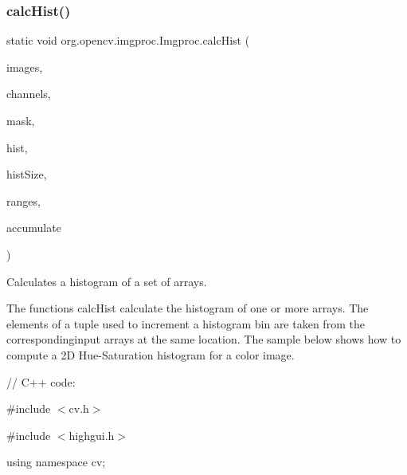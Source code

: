 \subsubsection{\texorpdfstring{calc\+Hist()}{calcHist()}\hspace{0.1cm}{\footnotesize\ttfamily [1/2]}}
{\footnotesize\ttfamily static void org.\+opencv.\+imgproc.\+Imgproc.\+calc\+Hist (\begin{DoxyParamCaption}\item[{List$<$ \mbox{\hyperlink{classorg_1_1opencv_1_1core_1_1_mat}{Mat}} $>$}]{images,  }\item[{\mbox{\hyperlink{classorg_1_1opencv_1_1core_1_1_mat_of_int}{Mat\+Of\+Int}}}]{channels,  }\item[{\mbox{\hyperlink{classorg_1_1opencv_1_1core_1_1_mat}{Mat}}}]{mask,  }\item[{\mbox{\hyperlink{classorg_1_1opencv_1_1core_1_1_mat}{Mat}}}]{hist,  }\item[{\mbox{\hyperlink{classorg_1_1opencv_1_1core_1_1_mat_of_int}{Mat\+Of\+Int}}}]{hist\+Size,  }\item[{\mbox{\hyperlink{classorg_1_1opencv_1_1core_1_1_mat_of_float}{Mat\+Of\+Float}}}]{ranges,  }\item[{boolean}]{accumulate }\end{DoxyParamCaption})\hspace{0.3cm}{\ttfamily [static]}}

Calculates a histogram of a set of arrays.

The functions {\ttfamily calc\+Hist} calculate the histogram of one or more arrays. The elements of a tuple used to increment a histogram bin are taken from the correspondinginput arrays at the same location. The sample below shows how to compute a 2D Hue-\/\+Saturation histogram for a color image. {\ttfamily }

{\ttfamily }

{\ttfamily }

{\ttfamily // C++ code\+:}

{\ttfamily }

{\ttfamily }

{\ttfamily \#include $<$cv.\+h$>$}

{\ttfamily }

{\ttfamily }

{\ttfamily \#include $<$highgui.\+h$>$}

{\ttfamily }

{\ttfamily }

{\ttfamily using namespace cv;}


